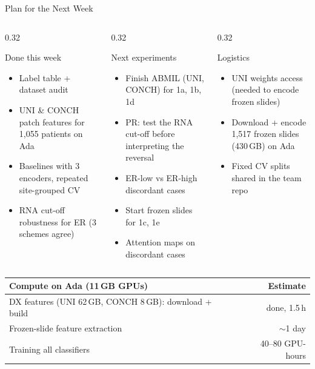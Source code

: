 \documentclass[aspectratio=169,10pt]{beamer}
\begin{document}
\begin{frame}[t]{Plan for the Next Week}
\footnotesize
\begin{columns}[T]
\begin{column}{0.32\textwidth}
\begin{block}{Done this week}
\begin{itemize}
  \item Label table + dataset audit
  \item UNI \& CONCH patch features for 1,055 patients on Ada
  \item Baselines with 3 encoders, repeated site-grouped CV
  \item RNA cut-off robustness for ER (3 schemes agree)
\end{itemize}
\end{block}
\end{column}
\begin{column}{0.32\textwidth}
\begin{block}{Next experiments}
\begin{itemize}
  \item Finish ABMIL (UNI, CONCH) for 1a, 1b, 1d
  \item PR: test the RNA cut-off before interpreting the reversal
  \item ER-low vs ER-high discordant cases
  \item Start frozen slides for 1c, 1e
  \item Attention maps on discordant cases
\end{itemize}
\end{block}
\end{column}
\begin{column}{0.32\textwidth}
\begin{block}{Logistics}
\begin{itemize}
  \item UNI weights access (needed to encode frozen slides)
  \item Download + encode 1,517 frozen slides (430\,GB) on Ada
  \item Fixed CV splits shared in the team repo
\end{itemize}
\end{block}
\end{column}
\end{columns}

\vspace{10pt}
\centering
\begin{tabular}{lr}
\toprule
Compute on Ada (11\,GB GPUs) & Estimate \\
\midrule
DX features (UNI 62\,GB, CONCH 8\,GB): download + build & done, 1.5\,h \\
Frozen-slide feature extraction & $\sim$1 day \\
Training all classifiers & 40--80 GPU-hours \\
\bottomrule
\end{tabular}
\end{frame}
\end{document}
